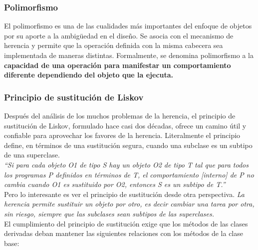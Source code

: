 \subsubsection{Polimorfismo}
El polimorfismo es una de las cualidades más importantes del enfoque
de objetos por su aporte a la ambigüedad en el diseño. Se asocia con
el mecanismo de herencia y permite que la operación definida con la
misma cabecera sea implementada de maneras distintas.  Formalmente, se
denomina polimorfismo a la \textbf{capacidad de una operación para manifestar
  un comportamiento diferente dependiendo del objeto que la ejecuta.}
\subsubsection{Principio de sustitución de Liskov}
Después del análisis de los muchos problemas de la herencia, el
principio de sustitución de Liskov, formulado hace casi dos décadas,
ofrece un camino útil y confiable para aprovechar los favores de la
herencia.  Literalmente el principio define, en términos de una
sustitución segura, cuando una subclase es un subtipo de una
superclase.  \\
\emph{“Si para cada objeto O1 de tipo S hay un objeto O2 de tipo T tal
  que para todos los programas P definidos en términos de T, el
  comportamiento [interno] de P no cambia cuando O1 es sustituido por
  O2, entonces S es un subtipo de T.”} \\
Pero lo interesante es ver el principio de sustitución desde otra
perspectiva.  \emph{La herencia permite sustituir un objeto por otro,
  es decir cambiar una tarea por otra, sin riesgo, siempre que las
  subclases sean subtipos de las superclases.}  \\
El cumplimiento del principio de sustitución exige que los métodos de
las clases derivadas deban mantener las siguientes relaciones con los
métodos de la clase base:
